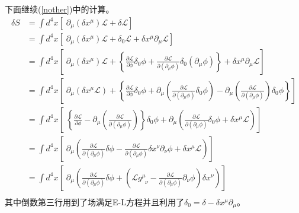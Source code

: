下面继续(\ref{nother})中的计算。
\begin{equation}
\begin{aligned}
    \delta S&=\int d^{4}x \left[\;\partial_{\mu}(\delta x^{\mu})\mathcal{L}+\delta \mathcal{L}\right]\\
    &=\int d^{4}x \left[\;\partial_{\mu}(\delta x^{\mu})\mathcal{L}+\delta_{0} \mathcal{L}+\delta x^{\mu} \partial_{\mu}\mathcal{L}\right]\\
    &=\int d^{4}x \left[\;\partial_{\mu}(\delta x^{\mu})\mathcal{L}+\left\{\frac{\partial \mathcal{L}}{\partial \phi} \delta_{0} \phi+\frac{\partial \mathcal{L}}{\partial (\partial_{\mu}\phi)} \delta_
    {0}\left(\partial_{\mu}\phi\right) \right\}+\delta x^{\mu} \partial_{\mu}\mathcal{L}\right]\\
    &=\int d^{4}x \left[\;\partial_{\mu}(\delta x^{\mu}\mathcal{L})+\left\{\frac{\partial \mathcal{L}}{\partial \phi} \delta_{0} \phi+\partial_{\mu}\left(\frac{\partial \mathcal{L}}{\partial (\partial_{\mu}\phi)} \delta_{0} \phi \right)-\partial_{\mu}\left(\frac{\partial \mathcal{L}}{\partial (\partial_{\mu}\phi)}\right) \delta_{0} \phi\right\}\right]\\
    &=\int d^{4}x \left[\;\left\{\frac{\partial \mathcal{L}}{\partial \phi}-\partial_{\mu}\left(\frac{\partial \mathcal{L}}{\partial (\partial_{\mu}\phi)}\right)\right\} \delta_{0} \phi+\partial_{\mu}\left(\frac{\partial \mathcal{L}}{\partial (\partial_{\mu}\phi)} \delta_{0} \phi +\delta x^{\mu}\mathcal{L}\right)\right]\\
     &=\int d^{4}x \left[\;\partial_{\mu}\left(\frac{\partial \mathcal{L}}{\partial (\partial_{\mu}\phi)} \delta \phi- \frac{\partial \mathcal{L}}{\partial (\partial_{\mu}\phi)} \delta x^{\nu}\partial_{\nu} \phi +\delta x^{\mu}\mathcal{L}\right)\right]\\
      &=\int d^{4}x \left[\;\partial_{\mu}\left(\frac{\partial \mathcal{L}}{\partial (\partial_{\mu}\phi)} \delta \phi +\left(\mathcal{L}g^{\mu}_{\;\;\nu}- \frac{\partial \mathcal{L}}{\partial (\partial_{\mu}\phi)} \partial_{\nu} \phi\right)\delta x^{\nu}\right) \right]\\
    \end{aligned}
\end{equation}
其中倒数第三行用到了场满足E-L方程并且利用了$\delta_{0}=\delta-\delta x^{\mu}\partial_{\mu}$。

